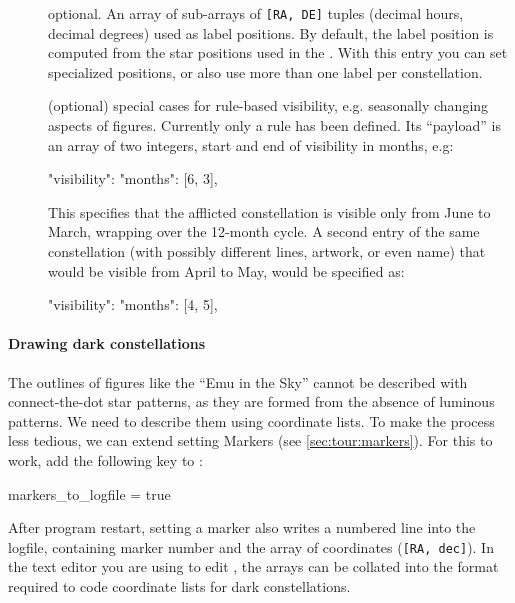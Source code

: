 \begin{description}
\item[] optional. An array of sub-arrays of \texttt{[RA, DE]} tuples (decimal hours, decimal degrees) used as label positions. 
                               By default, the label position is computed from the star positions used in the . 
			                   With this entry you can set specialized positions, or also use more than one label per constellation. 
\item[] (optional) special cases for rule-based visibility, e.g. seasonally changing aspects of figures. 
	Currently only a  rule has been defined. 
	Its ``payload'' is an array of two integers, start and end of visibility in months, e.g:

	\begin{jsonfile}
"visibility": {"months": [6, 3]},
	\end{jsonfile}
%
This specifies that the afflicted constellation is visible only from June to March, wrapping over the 12-month cycle. 
A second entry of the same constellation (with possibly different lines, artwork, or even name) 
that would be visible from April to May, would be specified as:
\begin{jsonfile}
"visibility": {"months": [4, 5]},
\end{jsonfile}
\end{description}


\paragraph{Drawing dark constellations}
The outlines of figures like the ``Emu in the Sky'' cannot be described with connect-the-dot star patterns, 
as they are formed from the absence of luminous patterns. We need to describe them using coordinate lists. 
To make the process less tedious, we can extend setting Markers (see \ref{sec:tour:markers}). 
For this to work, add the following key to :
\begin{configfile}
[devel]
markers_to_logfile = true
\end{configfile}
After program restart, setting a marker also writes a numbered line into the logfile, 
containing marker number and the array of coordinates (\texttt{[RA, dec]}). 
In the text editor you are using to edit , 
the arrays can be collated into the format required to code coordinate lists for dark constellations.

